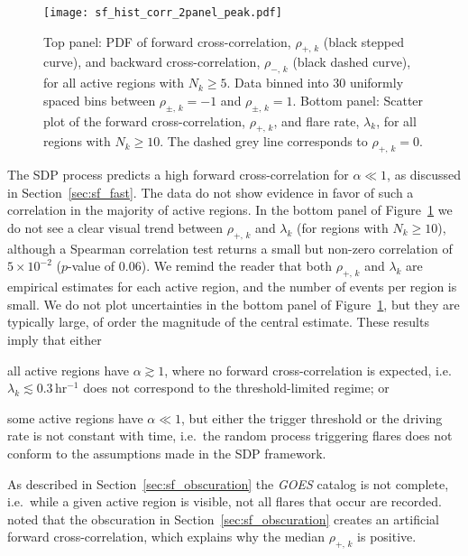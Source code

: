 \begin{figure}
\centering
\texttt{[image: sf\_hist\_corr\_2panel\_peak.pdf]}
\caption{Top panel: PDF of forward cross-correlation, $\rho_{+,\,k}$ (black stepped curve), and backward cross-correlation, $\rho_{-,\,k}$ (black dashed curve), for all active regions with $N_k \geq 5$. Data binned into 30 uniformly spaced bins between $\rho_{\pm,\,k} = -1$ and $\rho_{\pm,\,k} = 1$. Bottom panel: Scatter plot of the forward cross-correlation, $\rho_{+,\,k}$, and flare rate, $\lambda_k$, for all regions with $N_k \geq 10$. The dashed grey line corresponds to $\rho_{+,\,k}=0$.}
\label{fig:sf_hist_corr}
\end{figure}

The SDP process predicts a high forward cross-correlation for $\alpha \ll 1$, as discussed in Section~\ref{sec:sf_fast}. The data do not show evidence in favor of such a correlation in the majority of active regions. In the bottom panel of Figure~\ref{fig:sf_hist_corr} we do not see a clear visual trend between $\rho_{+,\,k}$ and $\lambda_k$ (for regions with $N_k \geq 10$), although a Spearman correlation test returns a small but non-zero correlation of $5\times10^{-2}$ ($p$-value of $0.06$). We remind the reader that both $\rho_{+,\,k}$ and $\lambda_k$ are empirical estimates for each active region, and the number of events per region is small. We do not plot uncertainties in the bottom panel of Figure~\ref{fig:sf_hist_corr}, but they are typically large, of order the magnitude of the central estimate. These results imply that either \begin{enumerate*}
\item all active regions have $\alpha \gtrsim 1$, where no forward cross-correlation is expected, i.e. $\lambda_k \lesssim 0.3\,$hr$^{-1}$ does not correspond to the threshold-limited regime; or
\item some active regions have $\alpha \ll 1$, but either the trigger threshold or the driving rate is not constant with time, i.e.~the random process triggering flares does not conform to the assumptions made in the SDP framework.
\end{enumerate*}

As described in Section~\ref{sec:sf_obscuration} the \emph{GOES} catalog is not complete, i.e.~while a given active region is visible, not all flares that occur are recorded. \citet{Wheatland2000corr} noted that the obscuration in Section~\ref{sec:sf_obscuration} creates an artificial forward cross-correlation, which explains why the median $\rho_{+,\,k}$ is positive. 

